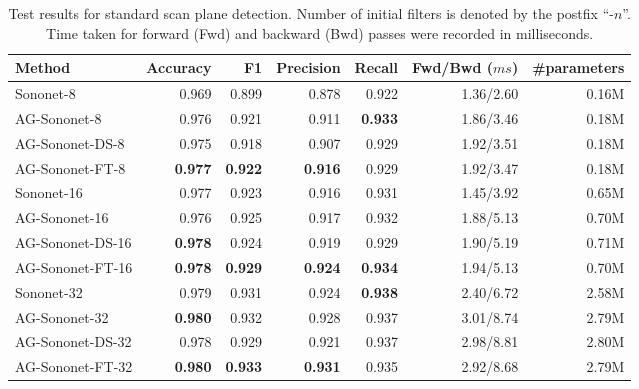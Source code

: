 \documentclass{article}
\begin{document}
\begin{table}
\centering
\caption{Test results for standard scan plane detection. Number of initial filters is denoted by the postfix ``-$n$''. Time taken for forward (Fwd) and backward (Bwd) passes were recorded in milliseconds. }
\begin{tabular}{lrrrrrr}
\toprule
Method & Accuracy & F1 & Precision & Recall & Fwd/Bwd ($ms$) & \#parameters \\
\hline
Sononet-8       & 0.969          & 0.899          & 0.878          & 0.922          & 1.36/2.60 & 0.16M %
\\
AG-Sononet-8    & 0.976          & 0.921          & 0.911          & \textbf{0.933} & 1.86/3.46 & 0.18M %
\\
AG-Sononet-DS-8 & 0.975          & 0.918          & 0.907          & 0.929          & 1.92/3.51 & 0.18M %
\\
AG-Sononet-FT-8 & \textbf{0.977} & \textbf{0.922} & \textbf{0.916} & 0.929          & 1.92/3.47 & 0.18M %
\\

\hline
Sononet-16       & 0.977          & 0.923          & 0.916          & 0.931          & 1.45/3.92 & 0.65M %
\\
AG-Sononet-16    & 0.976          & 0.925          & 0.917          & 0.932          & 1.88/5.13 & 0.70M %
\\
AG-Sononet-DS-16 & \textbf{0.978} & 0.924          & 0.919          & 0.929          & 1.90/5.19 & 0.71M %
\\
AG-Sononet-FT-16 & \textbf{0.978} & \textbf{0.929} & \textbf{0.924} & \textbf{0.934} & 1.94/5.13 & 0.70M %
\\
\hline
Sononet-32       & 0.979          & 0.931          & 0.924          & \textbf{0.938} & 2.40/6.72 & 2.58M %
\\
AG-Sononet-32    & \textbf{0.980} & 0.932          & 0.928          & 0.937          & 3.01/8.74 & 2.79M %
\\
AG-Sononet-DS-32 & 0.978          & 0.929          & 0.921          & 0.937          & 2.98/8.81 & 2.80M %
\\
AG-Sononet-FT-32 & \textbf{0.980} & \textbf{0.933} & \textbf{0.931} & 0.935          & 2.92/8.68 & 2.79M %
\\
\bottomrule
\end{tabular}
\label{table:result1}
\end{table}
\end{document}
